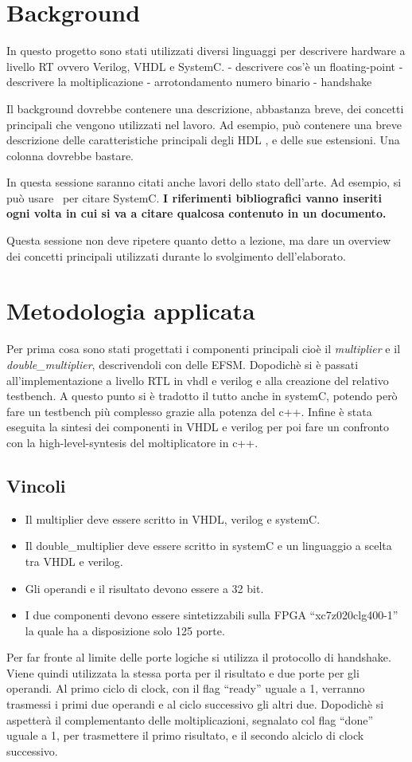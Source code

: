 \documentclass[]{IEEEtran}
\begin{document}
\section{Background}
In questo progetto sono stati utilizzati diversi linguaggi per descrivere hardware a livello RT ovvero Verilog, VHDL e SystemC.
- descrivere cos'è un floating-point
- descrivere la moltiplicazione
- arrotondamento numero binario
- handshake

Il background dovrebbe contenere una descrizione, abbastanza breve, dei concetti principali che vengono utilizzati nel lavoro. Ad esempio, può contenere una breve descrizione delle caratteristiche principali degli HDL , e delle sue estensioni. Una colonna dovrebbe bastare.

In questa sessione saranno citati anche lavori dello stato dell'arte. Ad esempio, si può usare~\cite{SystemC} per citare SystemC. \textbf{I riferimenti bibliografici vanno inseriti ogni volta in cui si va a citare qualcosa contenuto in un documento.}

Questa sessione non deve ripetere quanto detto a lezione, ma dare un overview dei concetti principali utilizzati durante lo svolgimento dell'elaborato.


\section{Metodologia applicata}
Per prima cosa sono stati progettati i componenti principali cioè il {\it multiplier} e il {\it double\_multiplier}, descrivendoli con delle EFSM. Dopodichè si è passati all'implementazione a livello RTL in vhdl e verilog e alla creazione del relativo testbench. A questo punto si è tradotto il tutto anche in systemC, potendo però fare un testbench più complesso grazie alla potenza del c++. Infine è stata eseguita la sintesi dei componenti in VHDL e verilog per poi fare un confronto con la high-level-syntesis del moltiplicatore in c++.

\subsection{Vincoli}
\begin{itemize}
    \item Il multiplier deve essere scritto in VHDL, verilog e systemC.
    \item Il double\_multiplier deve essere scritto in systemC e un linguaggio a scelta tra VHDL e verilog.
    \item Gli operandi e il risultato devono essere a 32 bit.
    \item I due componenti devono essere sintetizzabili sulla FPGA ``xc7z020clg400-1'' la quale ha a disposizione solo 125 porte.
\end{itemize}
Per far fronte al limite delle porte logiche si utilizza il protocollo di handshake. Viene quindi utilizzata la stessa porta per il risultato e due porte per gli operandi. Al primo ciclo di clock, con il flag ``ready'' uguale a 1, verranno trasmessi i primi due operandi e al ciclo successivo gli altri due. Dopodichè si aspetterà il complementanto delle moltiplicazioni, segnalato col flag ``done'' uguale a 1, per trasmettere il primo risultato, e il secondo alciclo di clock successivo.
\end{document}
